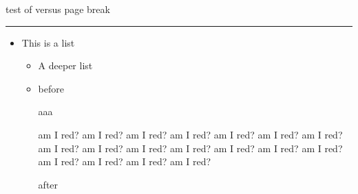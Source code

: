 \documentclass[a4paper]{article}
\begin{document}
\noindent\hrulefill test of \string\color\space versus page break\hrulefill

\vspace{17cm}

\hrule

\begin{itemize}
\item This is a list

  \begin{itemize}
  \item A deeper list

  \item
    before

    \begin{snugshade*}

      aaa

      \color{red}

      am I red?  am I red?  am I red?  am I red?  am I red?  am I red?  am I
      red?  am I red?  am I red?  am I red?  am I red?  am I red?  am I red?
      am I red?  am I red?  am I red?  am I red?  am I red?
    \end{snugshade*}

    after
  \end{itemize}
\end{itemize}
\end{document}
